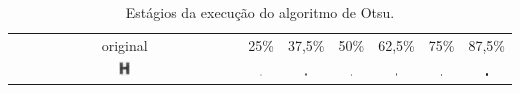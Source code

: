 \documentclass[a4paper,11pt]{article}
\begin{document}
      \begin{center}

      \begin{table}
        \caption{Estágios da execução do algoritmo de Otsu.}
        \begin{tabular}[p]{@{}ccccccc@{}}
          \centering

          original & 25\% & 37,5\% & 50\% & 62,5\% & 75\% & 87,5\% \\

          \includegraphics[width=0.05\textwidth]{assets/binarization/gray3_big.png}
          &
          \includegraphics[width=0.05\textwidth]{assets/binarization/h25t.png}
          &
          \includegraphics[width=0.05\textwidth]{assets/binarization/h38t.png}
          &
          \includegraphics[width=0.05\textwidth]{assets/binarization/h50t.png}
          &
          \includegraphics[width=0.05\textwidth]{assets/binarization/h63t.png}
          &
          \includegraphics[width=0.05\textwidth]{assets/binarization/h75t.png}
          &
          \includegraphics[width=0.05\textwidth]{assets/binarization/h88t.png}
          \\



\end{tabular}
\end{table}
\end{center}
\end{document}
